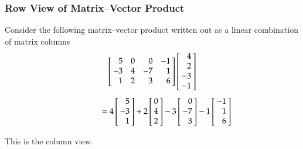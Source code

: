 \documentclass[10pt]{beamer}
\begin{document}
\begin{frame}
\frametitle{Row View of Matrix--Vector Product}

Consider the following matrix--vector product written out as a linear
combination of matrix columns
\begin{equation*}
    \left[\negthickspace
          \begin{array}{rrrr}  5 &  0  &  0  &  -1  \\
                              -3 &  4  & -7  &   1  \\
                               1 &  2  &  3  &   6  \end{array}\negthickspace\right]
    \left[\negthickspace
          \begin{array}{r}  4 \\  2  \\  -3  \\  -1 \end{array}\negthickspace\right]
\end{equation*}
\begin{equation*}
    \ \ \ \ \ \ \ \ \ \ \ \ \ \
    = 4\left[\negthickspace\begin{array}{r}  5 \\ -3 \\  1 \end{array}\negthickspace\right]
    + 2\left[\negthickspace\begin{array}{r}  0 \\  4 \\  2 \end{array}\negthickspace\right]
    - 3\left[\negthickspace\begin{array}{r}  0 \\ -7 \\  3 \end{array}\negthickspace\right]
    - 1\left[\negthickspace\begin{array}{r} -1 \\  1 \\  6 \end{array}\negthickspace\right]
\end{equation*}

\vspace{2ex}
This is the column view.

\end{frame}
\end{document}
